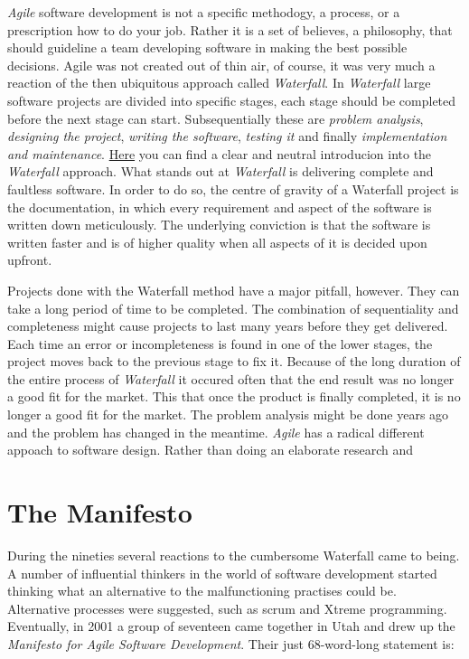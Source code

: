 \documentclass[]{book}
\begin{document}
\emph{Agile} software development is not a specific methodogy, a process, or a prescription how to do your job. Rather it is a set of believes, a philosophy, that should guideline a team developing software in making the best possible decisions. Agile was not created out of thin air, of course, it was very much a reaction of the then ubiquitous approach called \emph{Waterfall}. In \emph{Waterfall} large software projects are divided into specific stages, each stage should be completed before the next stage can start. Subsequentially these are \emph{problem analysis}, \emph{designing the project}, \emph{writing the software}, \emph{testing it} and finally \emph{implementation and maintenance}. \href{https://www.youtube.com/watch?v=LxEmGNgqYJA}{Here} you can find a clear and neutral introducion into the \emph{Waterfall} approach. What stands out at \emph{Waterfall} is delivering complete and faultless software. In order to do so, the centre of gravity of a Waterfall project is the documentation, in which every requirement and aspect of the software is written down meticulously. The underlying conviction is that the software is written faster and is of higher quality when all aspects of it is decided upon upfront.

Projects done with the Waterfall method have a major pitfall, however. They can take a long period of time to be completed. The combination of sequentiality and completeness might cause projects to last many years before they get delivered. Each time an error or incompleteness is found in one of the lower stages, the project moves back to the previous stage to fix it. Because of the long duration of the entire process of \emph{Waterfall} it occured often that the end result was no longer a good fit for the market. This that once the product is finally completed, it is no longer a good fit for the market. The problem analysis might be done years ago and the problem has changed in the meantime. \emph{Agile} has a radical different appoach to software design. Rather than doing an elaborate research and

\hypertarget{the-manifesto}{%
\section{The Manifesto}\label{the-manifesto}}

During the nineties several reactions to the cumbersome Waterfall came to being. A number of influential thinkers in the world of software development started thinking what an alternative to the malfunctioning practises could be. Alternative processes were suggested, such as scrum and Xtreme programming. Eventually, in 2001 a group of seventeen came together in Utah and drew up the \emph{Manifesto for Agile Software Development}. Their just 68-word-long statement is:
\end{document}
